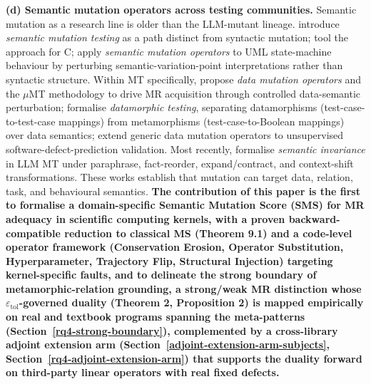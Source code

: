 \documentclass[12pt]{article}
\begin{document}
\textbf{(d) Semantic mutation operators across testing communities.}
Semantic mutation as a research line is older than the LLM-mutant
lineage. \citet{7a6c280d9584691800e71876c716ea229335abeb} introduce \emph{semantic
mutation testing} as a path distinct from syntactic mutation; \citet{dan2012smtc}
tool the approach for C; \citet{derezinska2019uml}
apply \emph{semantic mutation operators} to UML state-machine behaviour
by perturbing semantic-variation-point interpretations rather than
syntactic structure. Within MT specifically, \citet{sun2016mumt,sun2024datamutation}
propose \emph{data mutation operators} and the $\mu$MT methodology to drive
MR acquisition through controlled data-semantic perturbation; \citet{zhu2020datamorphic}
formalise \emph{datamorphic testing}, separating
datamorphisms (test-case-to-test-case mappings) from metamorphisms
(test-case-to-Boolean mappings) over data semantics; \citet{chan2024metamorphic}
extend generic data mutation operators to unsupervised
software-defect-prediction validation. Most recently, \citet{0fa97cc4e2a0ffb6a777669b1b541c0372fac0d2}
formalise \emph{semantic invariance} in LLM MT under paraphrase,
fact-reorder, expand/contract, and context-shift transformations. These
works establish that mutation can target data, relation, task, and
behavioural semantics. \textbf{The contribution of this paper is the
first to formalise a domain-specific Semantic Mutation Score (SMS) for
MR adequacy in scientific computing kernels, with a proven
backward-compatible reduction to classical MS (Theorem 9.1) and a
code-level operator framework (Conservation Erosion, Operator
Substitution, Hyperparameter, Trajectory Flip, Structural Injection)
targeting kernel-specific faults, and to delineate the strong boundary
of metamorphic-relation grounding, a strong/weak MR distinction whose
$\varepsilon_{\mathrm{tol}}$-governed duality (Theorem 2, Proposition 2)
is mapped empirically on real and textbook programs spanning the
meta-patterns (Section~\ref{rq4-strong-boundary}), complemented by a cross-library adjoint extension
arm (Section~\ref{adjoint-extension-arm-subjects}, Section~\ref{rq4-adjoint-extension-arm}) that supports the duality forward on third-party
linear operators with real fixed defects.}
\end{document}
